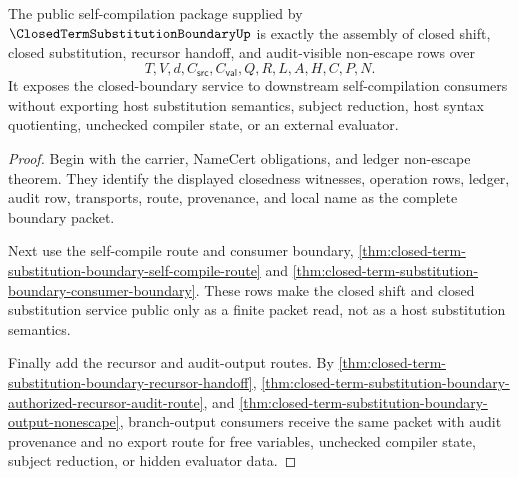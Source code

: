 \begin{theorem}
\label{thm:closed-term-substitution-boundary-self-compile-public-package}
The public self-compilation package supplied by $\ClosedTermSubstitutionBoundaryUp$ is exactly the assembly of closed shift, closed substitution, recursor handoff, and audit-visible non-escape rows over
$$
T,V,d,C_{\mathsf{src}},C_{\mathsf{val}},Q,R,L,A,H,C,P,N.
$$
It exposes the closed-boundary service to downstream self-compilation consumers without exporting host substitution semantics, subject reduction, host syntax quotienting, unchecked compiler state, or an external evaluator.
\end{theorem}
\begin{proof}
Begin with the carrier, NameCert obligations, and ledger non-escape theorem. They identify the displayed closedness witnesses, operation rows, ledger, audit row, transports, route, provenance, and local name as the complete boundary packet.

Next use the self-compile route and consumer boundary, \autoref{thm:closed-term-substitution-boundary-self-compile-route} and \autoref{thm:closed-term-substitution-boundary-consumer-boundary}. These rows make the closed shift and closed substitution service public only as a finite packet read, not as a host substitution semantics.

Finally add the recursor and audit-output routes. By \autoref{thm:closed-term-substitution-boundary-recursor-handoff}, \autoref{thm:closed-term-substitution-boundary-authorized-recursor-audit-route}, and \autoref{thm:closed-term-substitution-boundary-output-nonescape}, branch-output consumers receive the same packet with audit provenance and no export route for free variables, unchecked compiler state, subject reduction, or hidden evaluator data.
\end{proof}

